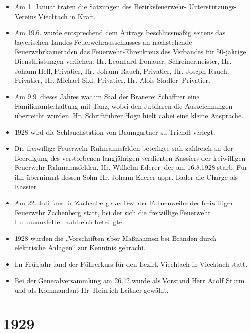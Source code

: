 \documentclass[12pt,a4paper]{book}
\begin{document}
\begin{itemize}
\item Am 1. Januar traten die Satzungen des Bezirksfeuerwehr-
Unterstützungs- Vereins Viechtach in Kraft.

\item Am 19.6. wurde entsprechend dem Antrage beschlussmäßig seitens das
bayerischen Landes-Feuerwehrausschlusses an nachstehende
Feuerwehrkameraden das Feuerwehr-Ehrenkreuz des Verbandes für 50-jährige
Dienstleistungen verliehen: Hr. Leonhard Donauer, Schreinermeister, Hr.
Johann Hell, Privatier, Hr. Johann Rauch, Privatier, Hr. Joseph Rauch,
Privatier, Hr. Michael Sixl, Privatier, Hr. Alois Stadler, Privatier.

\item Am 9.9. dieses Jahres war im Saal der Brauerei Schaffner eine
Familienunterhaltung mit Tanz, wobei den Jubilaren die Auszeichnungen
überreicht wurden. Hr. Schriftführer Högn hielt dabei eine kleine
Ansprache.

\item 1928 wird die Schlauchstation von Baumgartner zu Triendl verlegt.

\item Die freiwillige Feuerwehr Ruhmannsfelden beteiligte sich zahlreich
an der Beerdigung des verstorbenen langjährigen verdienten Kassiers der
freiwilligen Feuerwehr Ruhmannsfelden, Hr. Wilhelm Ederer, der am
16.8.1928 starb. Für ihn übernimmt dessen Sohn Hr. Johann Ederer appr.
Bader die Charge als Kassier.

\item Am 22. Juli fand in Zachenberg das Fest der Fahnenweihe der
freiwilligen Feuerwehr Zachenberg statt, bei der sich die freiwillige
Feuerwehr Ruhmannsfelden zahlreich beteiligte.

\item 1928 wurden die „Vorschriften über Maßnahmen bei Bränden durch
elektrische Anlagen“ zur Kenntnis gebracht.

\item Im Frühjahr fand der Führerkurs für den Bezirk Viechtach in
Viechtach statt.

\item Bei der Generalversammlung am 26.12.wurde als Vorstand Herr Adolf
Sturm und als Kommandant Hr. Heinrich Leitner gewählt.
\end{itemize}

\section*{1929}
\end{document}
